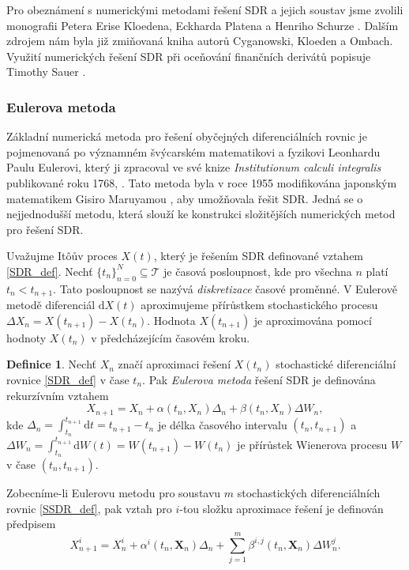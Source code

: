 \documentclass[a4paper,12pt]{report}
\theoremstyle{definition} \newtheorem{definice}[veta]{Definice}
\theoremstyle{remark}
\begin{document}
Pro obeznámení s numerickými metodami řešení SDR a jejich soustav jsme zvolili monografii Petera Erise Kloedena, Eckharda Platena a Henriho Schurze \cite{kloeden1997}.
Dalším zdrojem nám byla již zmiňovaná kniha \cite{cyganowski2002elementary} autorů Cyganowski, Kloeden a Ombach.
Využití numerických řešení SDR při oceňování finančních derivátů popisuje Timothy Sauer \cite{sauer2012numerical}.

\subsubsection{Eulerova metoda}
Základní numerická metoda pro řešení obyčejných diferenciálních rovnic je pojmenovaná po významném švýcarském matematikovi a fyzikovi Leonhardu Paulu Eulerovi, který ji zpracoval ve své knize \textit{Institutionum calculi integralis} publikované roku 1768, \cite{euler1768institutionum}.
Tato metoda byla v roce 1955 modifikována japonským matematikem Gisiro Maruyamou \cite{maruyama1955continuous}, aby umožňovala řešit SDR.
Jedná se o nejjednodušší metodu, která slouží ke konstrukci složitějších numerických metod pro řešení SDR.

Uvažujme It\^oův proces $X(t)$, který je řešením SDR definované vztahem \eqref{SDR_def}.
Nechť $\{t_n\}_{n=0}^N\subseteq \mathcal{T}$ je časová posloupnost, kde pro všechna $n$ platí $t_n<t_{n+1}$.
Tato  posloupnost se nazývá \textit{diskretizace} časové proměnné.
V Eulerově metodě diferenciál $\mathrm{d}X(t)$ aproximujeme přírůstkem stochastického procesu $\Delta X_n=X(t_{n+1})-X(t_n)$.
Hodnota $X(t_{n+1})$ je aproximována pomocí hodnoty $X(t_{n})$ v předcházejícím časovém kroku.
\begin{definice}\label{Euler_def}
Nechť $X_n$ značí aproximaci řešení $X(t_{n})$ stochastické diferenciální rovnice \eqref{SDR_def} v čase $t_n$.
Pak \textit{Eulerova metoda} řešení SDR je definována rekurzívním vztahem
\begin{equation}\label{Euler}
X_{n+1}=X_n+\alpha(t_n,X_n)\Delta_n+\beta(t_n,X_n)\Delta W_n,
\end{equation}
kde $\Delta_n=\int_{t_n}^{t_{n+1}}\mathrm{d}t=t_{n+1}-t_n$ je délka časového intervalu $(t_n,t_{n+1})$
a $\Delta W_n=\int_{t_n}^{t_{n+1}}\mathrm{d}W(t)=W(t_{n+1})-W(t_n)$ je přírůstek Wienerova procesu $W$ v čase $(t_n,t_{n+1})$.

Zobecníme-li Eulerovu metodu pro soustavu $m$ stochastických diferenciálních rovnic \eqref{SSDR_def}, pak vztah pro $i$-tou složku aproximace řešení je definován předpisem
\begin{equation}\label{Euler_soustava}
X_{n+1}^i=X_n^i+\alpha^i(t_n,\boldsymbol{X}_n)\Delta_n+\sum_{j=1}^m\beta^{i,j}(t_n,\boldsymbol{X}_n)\Delta W_n^j.
\end{equation}
\end{definice}
\end{document}
